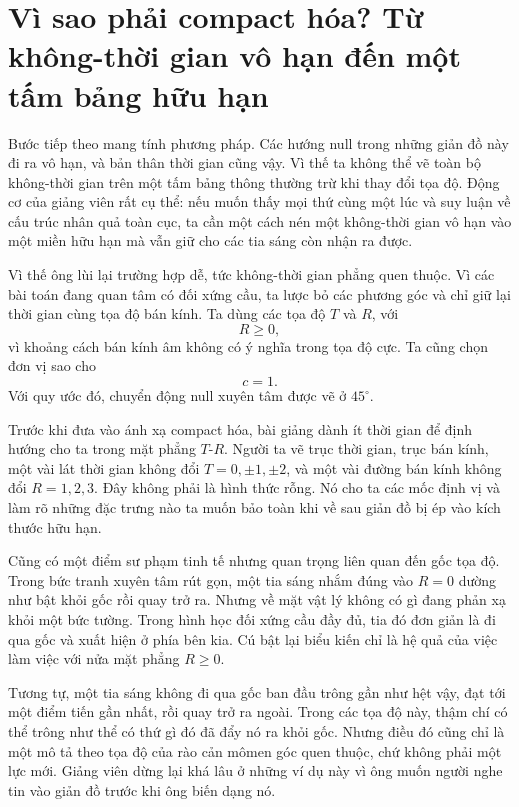 \section{Vì sao phải compact hóa? Từ không-thời gian vô hạn đến một tấm bảng hữu hạn}

Bước tiếp theo mang tính phương pháp. Các hướng null trong những giản đồ này đi ra vô hạn, và bản thân thời gian cũng vậy. Vì thế ta không thể vẽ toàn bộ không-thời gian trên một tấm bảng thông thường trừ khi thay đổi tọa độ. Động cơ của giảng viên rất cụ thể: nếu muốn thấy mọi thứ cùng một lúc và suy luận về cấu trúc nhân quả toàn cục, ta cần một cách nén một không-thời gian vô hạn vào một miền hữu hạn mà vẫn giữ cho các tia sáng còn nhận ra được.

Vì thế ông lùi lại trường hợp dễ, tức không-thời gian phẳng quen thuộc. Vì các bài toán đang quan tâm có đối xứng cầu, ta lược bỏ các phương góc và chỉ giữ lại thời gian cùng tọa độ bán kính. Ta dùng các tọa độ \(T\) và \(R\), với
\[
R\ge 0,
\]
vì khoảng cách bán kính âm không có ý nghĩa trong tọa độ cực. Ta cũng chọn đơn vị sao cho
\[
c=1.
\]
Với quy ước đó, chuyển động null xuyên tâm được vẽ ở \(45^\circ\).

Trước khi đưa vào ánh xạ compact hóa, bài giảng dành ít thời gian để định hướng cho ta trong mặt phẳng \(T\)-\(R\). Người ta vẽ trục thời gian, trục bán kính, một vài lát thời gian không đổi \(T=0,\pm1,\pm2\), và một vài đường bán kính không đổi \(R=1,2,3\). Đây không phải là hình thức rỗng. Nó cho ta các mốc định vị và làm rõ những đặc trưng nào ta muốn bảo toàn khi về sau giản đồ bị ép vào kích thước hữu hạn.

Cũng có một điểm sư phạm tinh tế nhưng quan trọng liên quan đến gốc tọa độ. Trong bức tranh xuyên tâm rút gọn, một tia sáng nhắm đúng vào \(R=0\) dường như bật khỏi gốc rồi quay trở ra. Nhưng về mặt vật lý không có gì đang phản xạ khỏi một bức tường. Trong hình học đối xứng cầu đầy đủ, tia đó đơn giản là đi qua gốc và xuất hiện ở phía bên kia. Cú bật lại biểu kiến chỉ là hệ quả của việc làm việc với nửa mặt phẳng \(R\ge 0\).

Tương tự, một tia sáng không đi qua gốc ban đầu trông gần như hệt vậy, đạt tới một điểm tiến gần nhất, rồi quay trở ra ngoài. Trong các tọa độ này, thậm chí có thể trông như thể có thứ gì đó đã đẩy nó ra khỏi gốc. Nhưng điều đó cũng chỉ là một mô tả theo tọa độ của rào cản mômen góc quen thuộc, chứ không phải một lực mới. Giảng viên dừng lại khá lâu ở những ví dụ này vì ông muốn người nghe tin vào giản đồ trước khi ông biến dạng nó.

